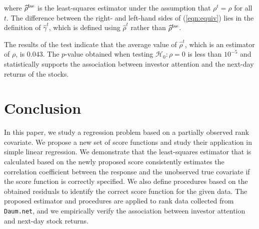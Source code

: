 \documentclass[12pt]{article}
\begin{document}
where $\widehat{\rho}^{\rm lse}$ is the least-squares estimator under the assumption that $\rho^t=\rho$
for all $t$. The difference between the right- and left-hand sides of (\ref{eqn:equiv}) lies in the definition of
 $\widehat{\gamma}^t$, which is defined using $\widehat{\rho}^t$ rather than 
$\widehat{\rho}^{\rm lse}$. 


The results of the test indicate that the average value of $\widehat{\rho}^t$, which is an estimator 
of $\rho$, is $0.043$.
The $p$-value obtained when testing $\mathcal{H}_0:
\rho=0$ is less than $10^{-5}$ and statistically supports the association between investor
attention and the next-day returns of the stocks. 


\section{Conclusion}

In this paper, we study a regression problem based on a partially observed rank covariate. We propose
a new set of score functions and study their application in simple linear regression. We demonstrate 
that the least-squares estimator that is calculated based on the newly proposed score consistently estimates the 
correlation coefficient between the response and the unobserved true covariate if the score 
function is correctly specified. We also define procedures based on the obtained residuals to identify 
the correct score function for the given data. The proposed estimator and procedures are 
applied to rank data collected from \texttt{Daum.net}, and we empirically verify the association between
investor attention and next-day stock returns. 
\end{document}
